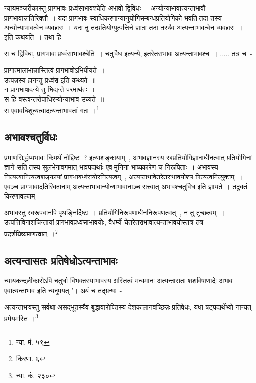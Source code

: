		न्यायमञ्जरीकास्तु प्रागभावः प्रध्वंसाभावश्चेति अभावो द्विविधः~। अन्योन्याभावात्यन्ताभावौ प्रागभावान्नातिरिक्तौ~। यदा प्रागभावः स्वाधिकरणान्यानुयोगिसम्बन्धप्रतियोगिको भवति तदा तस्य अन्योन्याभावत्वेन व्यवहारः~। यदा तु तत्प्रतियोग्युत्पत्तिर्न ज्ञाता तदा तस्यैव अत्यन्ताभावत्वेन व्यवहारः~। इति कथयति~। तथा हि~-

		{\fontsize{11.7}{0}\selectfont\s स च द्विविधः, प्रागभावः प्रध्वंसाभावश्चेति~। चतुर्विध इत्यन्ये, इतरेतराभावः अत्यन्ताभावश्च~। ..... तत्र च~-\\ \begin{center}प्रागात्मालाभान्नास्तित्वं प्रागभावोऽभिधीयते~।\\ उत्पन्नस्य हानन्तु प्रध्वंस इति कथ्यते~॥\\ न प्रागभावादन्ये तु भिद्यन्ते परमार्थतः~।\\ स हि वस्त्वन्तरोपाधिरन्योन्याभाव उच्यते~॥\\ स एवावधिशून्यत्वादत्यन्ताभावतां गतः~।\footnote{न्या. मं. ५९}\end{center}}

		\subsection{अभावश्चतुर्विधः}

		प्रमाणसिद्धोप्यभावः किमर्थं नोद्दिष्टः~? इत्याशङ्कायाम्~, अभावज्ञानस्य स्वप्रतियोगिज्ञानाधीनत्वात् प्रतियोगिनां ज्ञाने सति तस्य सुलभेनावगमात् भावपदार्थाः एव‌ मुनिना भाष्यकारेण च निरूपिताः~। अभावस्य नित्यत्वानित्यत्वशङ्कायां प्रागभावध्वंसयोरनित्यत्वम्~, अत्यन्ताभावेतरेतराभावयोश्च नित्यत्वमित्युक्तम्~। एवञ्च प्रागभावादतिरिक्तानाम् अत्यन्ताभावान्योन्याभावानाञ्च सत्त्वात् अभावश्चतुर्विध‌ इति ज्ञायते~। तदुक्तं किरणावल्याम्~- 

		{\fontsize{11.7}{0}\selectfont\s अभावस्तु स्वरूपवानपि पृथङ्निर्दिष्टः~। प्रतियोगिनिरूपणाधीननिरूपणत्वात्~, न तु तुच्छत्वम्~। उत्पत्तिविनाशचिन्तायां प्रागभावप्रध्वंसाभावयोः, वैधर्म्ये चेतरेतराभावात्यन्ताभावयोस्तत्र तत्र प्रदर्शयिष्यमाणत्वात्~।\footnote{किरणा. ६}}

		\subsection{अत्यन्तासतः प्रतिषेधोऽत्यन्ताभावः}

		न्यायकन्दलीकारोऽपि चतुर्धा विभक्तस्याभावस्य अस्तित्वं मन्यमानः‌ अत्यन्तासतः शशविषाणादेः अभाव एवात्यन्ताभाव इति न्यनूपयत् '। अयं च तद्ग्रन्थः~-

		{\fontsize{11.7}{0}\selectfont\s अत्यन्ताभावस्तु सर्वथा असद्भूतस्यैव बुद्धावारोपितस्य देशकालानवच्छिन्नः प्रतिषेधः, यथा षट्पदार्थेभ्यो नान्यत् प्रमेयमस्ति~।\footnote{न्या. कं. २३०}}

